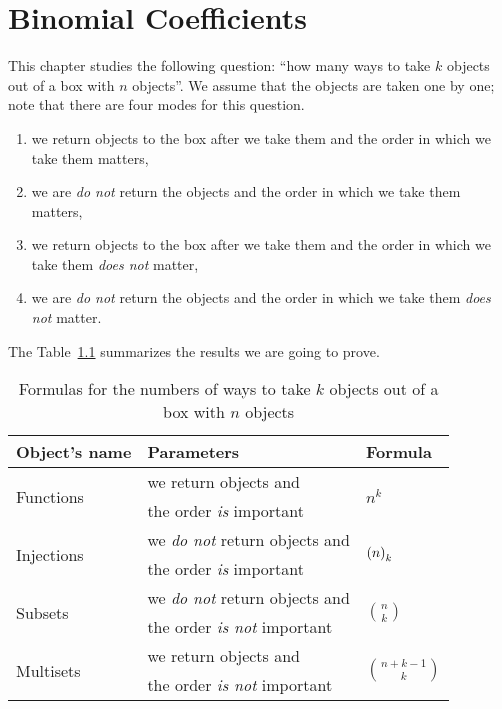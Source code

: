 \chapter{Binomial Coefficients}
\label{chapter:binomials}
This chapter studies the following question:
``how many ways to take $k$ objects out of a box with $n$ objects''.
We assume that the objects are taken one by one; note that there are four modes
for this question.
\begin{enumerate}
  \item we return objects to the box after we take them and the order in which
    we take them matters,
  \item we are \emph{do not} return the objects and the order in which
    we take them matters,
  \item we return objects to the box after we take them and the order in which
    we take them \emph{does not} matter,
  \item we are \emph{do not} return the objects and the order in which
    we take them \emph{does not} matter.
\end{enumerate}

The Table~\ref{table:selections} summarizes the results we are going
to prove.
\begin{table}[h!]
  \centering
  \begin{tabular}{lll}
    \toprule
    Object's name & Parameters & Formula \\
    \midrule
    \multirow{2}{*}{Functions} & we return objects and & \multirow{2}{*}{$n^k$} \\
                               & the order \emph{is} important & \\
    \multirow{2}{*}{Injections} & we \emph{do not} return objects and &
      \multirow{2}{*}{$\numberOfPermutations[k]{n}$} \\
                                & the order \emph{is} important & \\
    \multirow{2}{*}{Subsets} & we \emph{do not} return objects and & \multirow{2}{*}{$\binom{n}{k}$} \\
                             & the order \emph{is not} important & \\
    \multirow{2}{*}{Multisets} & we return objects and & \multirow{2}{*}{$\binom{n + k - 1}{k}$} \\
                               & the order \emph{is not} important & \\
    \bottomrule
  \end{tabular}
  \caption{Formulas for the numbers of ways to take $k$ objects out of a box
  with $n$ objects}
  \label{table:selections}
\end{table}

